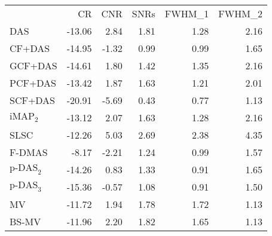 \begin{tabular}{lrrrrr}
 & CR & CNR & SNRs & FWHM_1 & FWHM_2 \\
DAS & -13.06 & 2.84 & 1.81 & 1.28 & 2.16 \\
CF+DAS & -14.95 & -1.32 & 0.99 & 0.99 & 1.65 \\
GCF+DAS & -14.61 & 1.80 & 1.42 & 1.35 & 2.16 \\
PCF+DAS & -13.42 & 1.87 & 1.63 & 1.21 & 2.01 \\
SCF+DAS & -20.91 & -5.69 & 0.43 & 0.77 & 1.13 \\
$\text{iMAP}_2$ & -13.12 & 2.07 & 1.63 & 1.28 & 2.16 \\
SLSC & -12.26 & 5.03 & 2.69 & 2.38 & 4.35 \\
F-DMAS & -8.17 & -2.21 & 1.24 & 0.99 & 1.57 \\
$\text{p-DAS}_2$ & -14.26 & 0.83 & 1.33 & 0.91 & 1.65 \\
$\text{p-DAS}_3$ & -15.36 & -0.57 & 1.08 & 0.91 & 1.50 \\
MV & -11.72 & 1.94 & 1.78 & 1.72 & 1.13 \\
BS-MV & -11.96 & 2.20 & 1.82 & 1.65 & 1.13 \\
\end{tabular}
